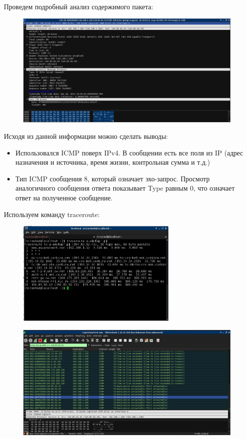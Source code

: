 \documentclass[russian,utf8,emptystyle]{eskdtext}
\begin{document}
Проведем подробный анализ содержимого пакета:
\begin{figure}[h!]
\centering
\includegraphics[width=1.0\textwidth]{003}
\end{figure}
\clearpage

Исходя из данной информации можно сделать выводы:
\begin{itemize}
\item Использовался ICMP поверх IPv4. В сообщении есть все поля из IP (адрес назначения и источника, время жизни, контрольная сумма и т.д.)
\item Тип ICMP сообщения 8, который означает эхо-запрос. Просмотр аналогичного сообщения ответа показывает Type равным 0, что означает ответ на полученное сообщение.
\end{itemize}

Используем команду traceroute:
\begin{figure}[h!]
\centering
\includegraphics[width=0.7\textwidth]{004}
\end{figure}
\begin{figure}[h!]
\centering
\includegraphics[width=\textwidth]{005}
\end{figure}
\end{document}
